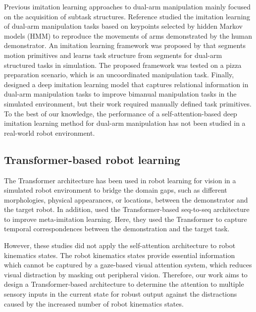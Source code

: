 \documentclass[letterpaper, 10 pt, conference]{ieeeconf}  %
\renewcommand\hl[1]{#1} %
\begin{document}
Previous imitation learning approaches to dual-arm manipulation mainly focused on the acquisition of subtask structures. Reference \cite{asfour2008imitation} studied the imitation learning of dual-arm manipulation tasks based on keypoints selected by hidden Markov models (HMM) to reproduce the movements of arms demonstrated by the human demonstrator. An imitation learning framework was proposed by \cite{caccavale2017imitation} that segments motion primitives and learns task structure from segments for dual-arm structured tasks in simulation. The proposed framework was tested on a pizza preparation scenario, which is an uncoordinated manipulation task. Finally, \cite{xie2020deep} designed a deep imitation learning model that captures relational information in dual-arm manipulation tasks to improve bimanual manipulation tasks in the simulated environment, but their work required manually defined task primitives.
To the best of our knowledge, the performance of a self-attention-based deep imitation learning method for dual-arm manipulation has not been studied in a real-world robot environment.

\subsection{Transformer-based robot learning}
The Transformer architecture has been used in robot learning for vision
\cite{dasari2020transformers} in a simulated robot environment to bridge the domain gaps, such as different morphologies, physical appearances, or locations, between the demonstrator and the target robot.
In addition, \cite{Cachet2020Transformer} used the Transformer-based seq-to-seq architecture to improve meta-imitation learning. Here, they used the Transformer to capture temporal correspondences between the demonstration and the target task. 

\hl{%
However, these studies did not apply the self-attention architecture to robot kinematics states.
The robot kinematics states provide essential information which cannot be captured by a gaze-based visual attention system, which reduces visual distraction by masking out peripheral vision. Therefore, our work aims to design a Transformer-based architecture to determine the attention to multiple sensory inputs in the current state for robust output against the distractions caused by the increased number of robot kinematics states.}
\end{document}
